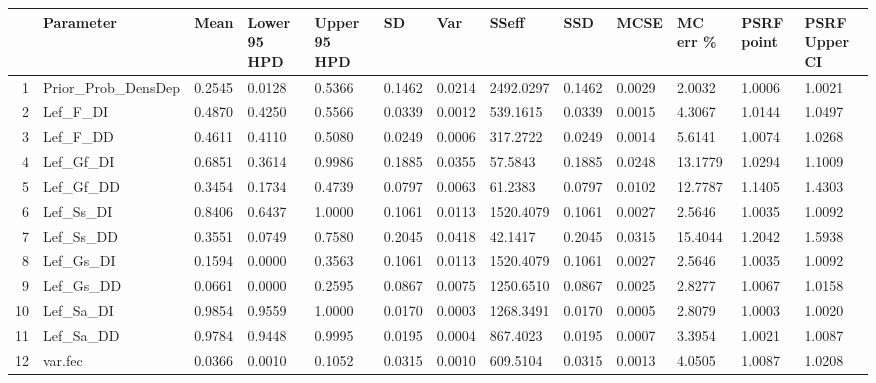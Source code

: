 \begin{table}[ht]
\centering
\begin{tabular}{rllllllllllll}
  \hline
 & Parameter & Mean & Lower 95 HPD & Upper 95 HPD & SD & Var & SSeff & SSD & MCSE & MC err \% & PSRF point & PSRF Upper CI \\ 
  \hline
1 & Prior\_Prob\_DensDep &    0.2545 &    0.0128 &    0.5366 &    0.1462 &       0.0214 & 2492.0297 &    0.1462 &  0.0029 &  2.0032 & 1.0006 & 1.0021 \\ 
  2 & Lef\_F\_DI &    0.4870 &    0.4250 &    0.5566 &    0.0339 &       0.0012 &  539.1615 &    0.0339 &  0.0015 &  4.3067 & 1.0144 & 1.0497 \\ 
  3 & Lef\_F\_DD &    0.4611 &    0.4110 &    0.5080 &    0.0249 &       0.0006 &  317.2722 &    0.0249 &  0.0014 &  5.6141 & 1.0074 & 1.0268 \\ 
  4 & Lef\_Gf\_DI &    0.6851 &    0.3614 &    0.9986 &    0.1885 &       0.0355 &   57.5843 &    0.1885 &  0.0248 & 13.1779 & 1.0294 & 1.1009 \\ 
  5 & Lef\_Gf\_DD &    0.3454 &    0.1734 &    0.4739 &    0.0797 &       0.0063 &   61.2383 &    0.0797 &  0.0102 & 12.7787 & 1.1405 & 1.4303 \\ 
  6 & Lef\_Ss\_DI &    0.8406 &    0.6437 &    1.0000 &    0.1061 &       0.0113 & 1520.4079 &    0.1061 &  0.0027 &  2.5646 & 1.0035 & 1.0092 \\ 
  7 & Lef\_Ss\_DD &    0.3551 &    0.0749 &    0.7580 &    0.2045 &       0.0418 &   42.1417 &    0.2045 &  0.0315 & 15.4044 & 1.2042 & 1.5938 \\ 
  8 & Lef\_Gs\_DI &    0.1594 &    0.0000 &    0.3563 &    0.1061 &       0.0113 & 1520.4079 &    0.1061 &  0.0027 &  2.5646 & 1.0035 & 1.0092 \\ 
  9 & Lef\_Gs\_DD &    0.0661 &    0.0000 &    0.2595 &    0.0867 &       0.0075 & 1250.6510 &    0.0867 &  0.0025 &  2.8277 & 1.0067 & 1.0158 \\ 
  10 & Lef\_Sa\_DI &    0.9854 &    0.9559 &    1.0000 &    0.0170 &       0.0003 & 1268.3491 &    0.0170 &  0.0005 &  2.8079 & 1.0003 & 1.0020 \\ 
  11 & Lef\_Sa\_DD &    0.9784 &    0.9448 &    0.9995 &    0.0195 &       0.0004 &  867.4023 &    0.0195 &  0.0007 &  3.3954 & 1.0021 & 1.0087 \\ 
  12 & var.fec &    0.0366 &    0.0010 &    0.1052 &    0.0315 &       0.0010 &  609.5104 &    0.0315 &  0.0013 &  4.0505 & 1.0087 & 1.0208 \\ 

\end{tabular}
\end{table}
